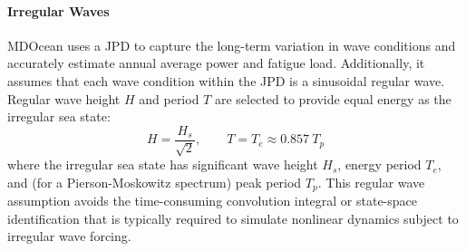 


\paragraph{Irregular Waves}
MDOcean uses a JPD to capture the long-term variation in wave conditions and accurately estimate annual average power and fatigue load.
Additionally, it assumes that each wave condition within the JPD is a sinusoidal regular wave.
Regular wave height $H$ and period $T$ are selected to provide equal energy as the irregular sea state:
\begin{equation}
    H = \frac{H_s}{\sqrt{2}}, \qquad T = T_e \approx 0.857 ~T_p 
\end{equation}
where the irregular sea state has significant wave height $H_s$, energy period $T_e$, and (for a Pierson-Moskowitz spectrum) peak period $T_p$.
This regular wave assumption avoids the time-consuming convolution integral or state-space identification that is typically required to simulate nonlinear dynamics subject to irregular wave forcing.

